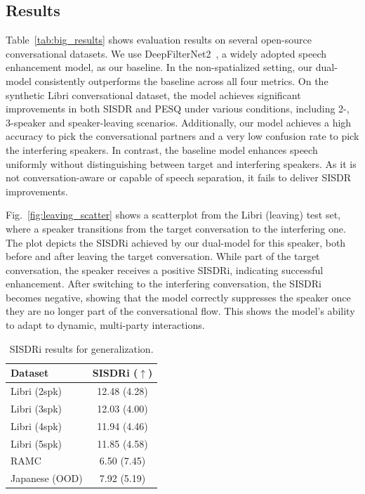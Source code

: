\subsection{Results}\label{sec:results}
Table~\ref{tab:big_results} shows evaluation results on several open-source conversational datasets. We use DeepFilterNet2~\cite{schroter2022deepfilternet2}, a widely adopted speech enhancement model, as our baseline. In the non-spatialized setting, our dual-model consistently outperforms the baseline across all four metrics. On the synthetic Libri conversational dataset, the model achieves significant improvements in both SISDR and PESQ under various conditions, including 2-, 3-speaker and speaker-leaving scenarios. Additionally, our model achieves a high accuracy to pick the conversational partners and  a very low confusion rate to pick the interfering speakers.  In contrast, the baseline model enhances  speech uniformly without distinguishing between target and interfering speakers. As it is not conversation-aware or capable of speech separation, it fails to deliver SISDR improvements.



Fig.~\ref{fig:leaving_scatter} shows a scatterplot from the Libri (leaving) test set, where a speaker transitions from the target conversation to the interfering one. The plot depicts the SISDRi achieved by our dual-model for this speaker, both before and after leaving the target conversation. While part of the target conversation, the speaker receives a positive SISDRi, indicating successful enhancement. After switching to the interfering conversation, the SISDRi becomes negative, showing that the model correctly suppresses the speaker once they are no longer part of the conversational flow. This shows  the model’s ability to adapt to dynamic, multi-party interactions.

\begin{table}[t!]
\caption{SISDRi results for generalization.}
\vskip -0.1in
\centering
  \setlength{\tabcolsep}{5pt} %
{\footnotesize
\begin{tabular}{lc}
\toprule
\textbf{Dataset} & SISDRi ($\uparrow$) \\
\midrule
Libri (2spk)        & 12.48 (4.28) \\
Libri (3spk)        & 12.03 (4.00) \\
Libri (4spk)        & 11.94 (4.46) \\
Libri (5spk)        & 11.85 (4.58) \\
\midrule
RAMC                & 6.50 (7.45)  \\
Japanese (OOD)      & 7.92 (5.19)  \\
\bottomrule
\end{tabular}
}
\label{tab:sisdr_datasets}
\vskip -0.15in
\end{table}



